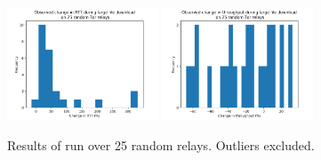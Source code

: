 \documentclass[12pt,journal]{IEEEtran}
\begin{document}
\begin{figure}
 \center
  \includegraphics[width=0.4\textwidth]{figures/rtt_avg.png}
  \includegraphics[width=0.4\textwidth]{figures/thr_avg.png}
  \caption{Results of run over 25 random relays. Outliers excluded.}
  \label{AAA}

\end{figure}
\end{document}

